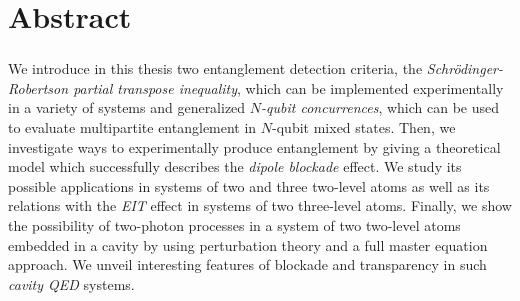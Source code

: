 \chapter*{Abstract} 

\subsection*{\thesistitle}

We introduce in this thesis two entanglement detection criteria, the \textit{Schr\"odinger-Robertson partial transpose inequality}, which can be implemented experimentally in a variety of systems and generalized \textit{$N$-qubit concurrences}, which can be used to evaluate multipartite entanglement in $N$-qubit mixed states. Then, we investigate ways to experimentally produce entanglement by giving a theoretical model which successfully describes the \textit{dipole blockade} effect. We study its possible applications in systems of two and three two-level atoms as well as its relations with the \textit{EIT} effect in systems of two three-level atoms. Finally, we show the possibility of two-photon processes in a system of two two-level atoms embedded in a cavity by using perturbation theory and a full master equation approach. We unveil interesting features of blockade and transparency in such \textit{cavity QED} systems.